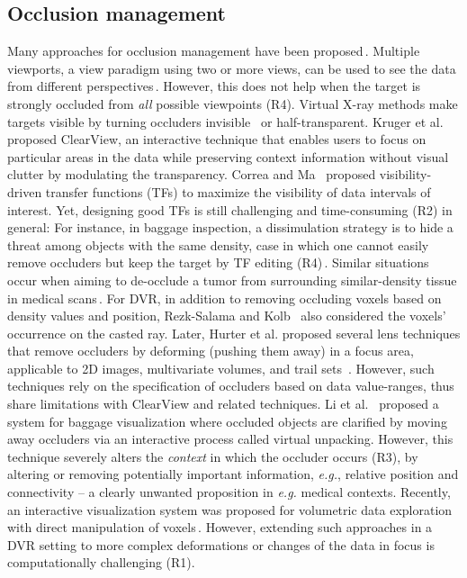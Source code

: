 \subsection{Occlusion management}
%
Many approaches for occlusion management have been proposed\,\cite{4483791}. Multiple viewports, a view paradigm using two or more views, can be used to see the data from different perspectives\,\cite{WangBaldonado:2000:GUM:345513.345271}. However, this does not help when the target is strongly occluded from \emph{all} possible viewpoints (R4). Virtual X-ray methods make targets visible by turning occluders invisible~\cite{Burns:2008:ACC:1457515.1409107} or half-transparent. Kruger et al.~\cite{4015450} proposed ClearView, an interactive technique that enables users to focus on particular areas in the data while preserving context information without visual clutter by modulating the transparency. Correa and Ma~\cite{5416704} proposed visibility-driven transfer functions (TFs) to maximize the visibility of data intervals of interest. Yet, designing good TFs is still challenging and time-consuming (R2) in general: For instance, in baggage inspection, a dissimulation strategy is to hide a threat among objects with the same density, case in which one cannot easily remove occluders but keep the target by TF editing (R4)\,\cite{7819413}. Similar situations occur when aiming to de-occlude a tumor from surrounding similar-density tissue in medical scans\,\cite{CGF:CGF12927}. For DVR, in addition to removing occluding voxels based on density values and position, Rezk-Salama and Kolb~\cite{CGF:CGF979} also considered the voxels' occurrence on the casted ray. Later, Hurter et al. proposed several lens techniques that remove occluders by deforming (pushing them away) in a focus area, applicable to 2D images, multivariate volumes, and trail sets~\cite{moleview,6787171}. However, such techniques rely on the specification of occluders based on data value-ranges, thus share limitations with ClearView and related techniques. Li et al.~\cite{Li:2012:LVV:2425296.2425325} proposed a system for baggage visualization where occluded objects are clarified by moving away occluders via an interactive process called virtual unpacking. However, this technique severely alters the \emph{context} in which the occluder occurs (R3), by altering or removing potentially important information, \emph{e.g.}, relative position and connectivity -- a clearly unwanted proposition in \emph{e.g.} medical contexts. Recently, an interactive visualization system was proposed for volumetric data exploration with direct manipulation of voxels\,\cite{7819413}. However, extending such approaches in a DVR setting to more complex deformations or changes of the data in focus is computationally challenging (R1).

